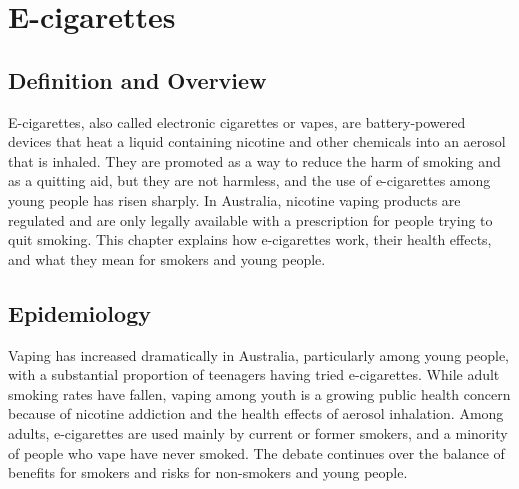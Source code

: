 \chapter{E-cigarettes}

\section*{Definition and Overview}
E-cigarettes, also called electronic cigarettes or vapes, are battery-powered devices that heat a liquid containing nicotine and other chemicals into an aerosol that is inhaled. They are promoted as a way to reduce the harm of smoking and as a quitting aid, but they are not harmless, and the use of e-cigarettes among young people has risen sharply. In Australia, nicotine vaping products are regulated and are only legally available with a prescription for people trying to quit smoking. This chapter explains how e-cigarettes work, their health effects, and what they mean for smokers and young people.

\section*{Epidemiology}
Vaping has increased dramatically in Australia, particularly among young people, with a substantial proportion of teenagers having tried e-cigarettes. While adult smoking rates have fallen, vaping among youth is a growing public health concern because of nicotine addiction and the health effects of aerosol inhalation. Among adults, e-cigarettes are used mainly by current or former smokers, and a minority of people who vape have never smoked. The debate continues over the balance of benefits for smokers and risks for non-smokers and young people.

